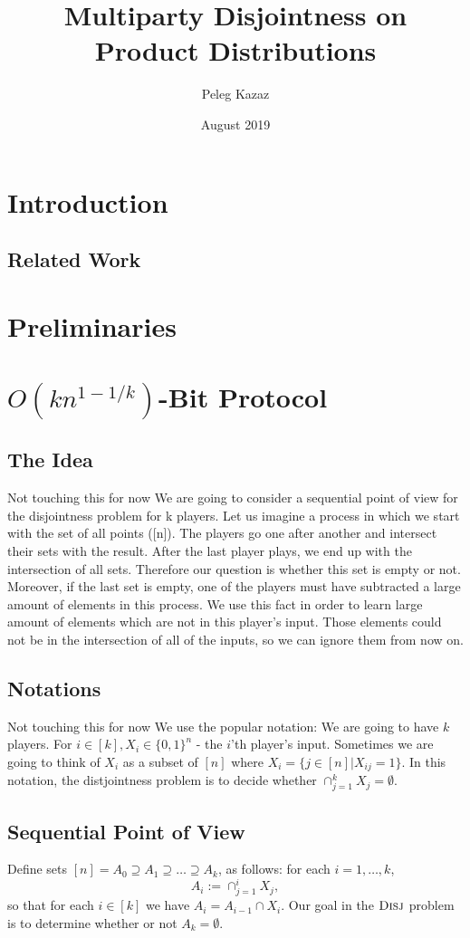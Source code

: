 \documentclass{article}
\title{Multiparty Disjointness on Product Distributions}
\author{Peleg Kazaz}
\date{August 2019}
\newcommand{\coloneq}{:=}
\newcommand{\prob}[1]{\ensuremath{\text{\textsc{#1}}}}
\newcommand{\Rnote}[1]{ { \color{magenta} #1 } }
\theoremstyle{plain}
\begin{document}
\maketitle


\section{Introduction}

\subsection{Related Work}
\section{Preliminaries}

\section{$O(kn^{1-1/k})$-Bit Protocol}
\subsection{The Idea}
\Rnote{Not touching this for now}
We are going to consider a sequential point of view for the disjointness problem for k players. Let us imagine a process in which we start with the set of all points ([n]). The players go one after another and intersect their sets with the result. After the last player plays, we end up with the intersection of all sets. Therefore our question is whether this set is empty or not. Moreover, if the last set is empty, one of the players must have subtracted a large amount of elements in this process. We use this fact in order to learn large amount of elements which are not in this player's input. Those elements could not be in the intersection of all of the inputs, so we can ignore them from now on. 
\subsection{Notations}
\Rnote{Not touching this for now}
We use the popular notation: We are going to have $k$ players. For $i \in [k], X_i \in \{0,1\}^{n}$ - the $i$'th player's input. Sometimes we are going to think of $X_i$ as a subset of $[n]$ where $X_i = \{j \in [n] | X_{ij} = 1\}$. In this notation, the distjointness problem is to decide whether $\cap^{k}_{j=1}X_j = \emptyset$. \newline
\subsection{Sequential Point of View}
Define sets $[n] = A_0 \supseteq A_1 \supseteq \ldots \supseteq A_k$, as follows:
for each $i = 1,\ldots,k$,
\begin{equation*}
  A_i \coloneq \cap_{j = 1}^i X_j,
\end{equation*}
so that for each $i \in [k]$ we have $A_i = A_{i-1} \cap X_i$.
Our goal in the $\prob{Disj}$ problem is to determine whether or not $A_k = \emptyset$.
\end{document}
